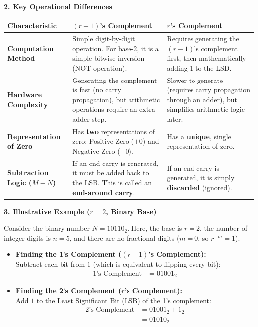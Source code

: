 \documentclass[12pt,a3paper]{article}
\begin{document}
\begin{enumerate}
\begin{tcolorbox}[enhanced,breakable,ansbox,colback=cD!4,colframe=cD,boxrule=0.8pt,arc=5pt,title={\textbf{Answer}},fonttitle=\bfseries\color{white},colbacktitle=cD]
\vspace{1em}
\textbf{\textcolor{cD}{2. Key Operational Differences}}

\begin{center}
\renewcommand{\arraystretch}{1.4}
\begin{tabular}{p{3.8cm} p{5.5cm} p{5.5cm}}
\toprule
\textbf{Characteristic} & \textbf{$(r-1)$'s Complement} & \textbf{$r$'s Complement} \\
\midrule
\textbf{Computation Method} & Simple digit-by-digit operation. For base-2, it is a simple bitwise inversion (NOT operation). & Requires generating the $(r-1)$'s complement first, then mathematically adding 1 to the LSD. \\
\textbf{Hardware Complexity} & Generating the complement is fast (no carry propagation), but arithmetic operations require an extra adder step. & Slower to generate (requires carry propagation through an adder), but simplifies arithmetic logic later. \\
\textbf{Representation of Zero} & Has \textbf{two} representations of zero: Positive Zero ($+0$) and Negative Zero ($-0$). & Has a \textbf{unique}, single representation of zero. \\
\textbf{Subtraction Logic ($M - N$)} & If an end carry is generated, it must be added back to the LSB. This is called an \textbf{end-around carry}. & If an end carry is generated, it is simply \textbf{discarded} (ignored). \\
\bottomrule
\end{tabular}
\end{center}

\vspace{1em}
\textbf{\textcolor{cD}{3. Illustrative Example ($r = 2$, Binary Base)}}

Consider the binary number $N = 10110_2$. Here, the base is $r=2$, the number of integer digits is $n=5$, and there are no fractional digits ($m=0$, so $r^{-m} = 1$).

\begin{itemize}
    \item \textbf{Finding the 1's Complement ($(r-1)$'s Complement):} \\
    Subtract each bit from $1$ (which is equivalent to flipping every bit):
    \begin{align*}
        1\text{'s Complement} &= 01001_2
    \end{align*}
    
    \item \textbf{Finding the 2's Complement ($r$'s Complement):} \\
    Add $1$ to the Least Significant Bit (LSB) of the 1's complement:
    \begin{align*}
        2\text{'s Complement} &= 01001_2 + 1_2 \\
        &= 01010_2
    \end{align*}
\end{itemize}


\end{tcolorbox}
\end{enumerate}
\end{document}
